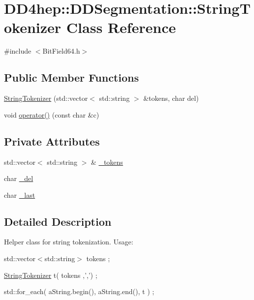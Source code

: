 \hypertarget{class_d_d4hep_1_1_d_d_segmentation_1_1_string_tokenizer}{
\section{DD4hep::DDSegmentation::StringTokenizer Class Reference}
\label{class_d_d4hep_1_1_d_d_segmentation_1_1_string_tokenizer}
}


{\ttfamily \#include $<$BitField64.h$>$}\subsection*{Public Member Functions}
\begin{DoxyCompactItemize}
\item 
\hyperlink{class_d_d4hep_1_1_d_d_segmentation_1_1_string_tokenizer_aae9366c4f1ddf75a606c77af83970f8c}{StringTokenizer} (std::vector$<$ std::string $>$ \&tokens, char del)
\item 
void \hyperlink{class_d_d4hep_1_1_d_d_segmentation_1_1_string_tokenizer_a9a7f740ffc721446c786bd7aed987a4b}{operator()} (const char \&c)
\end{DoxyCompactItemize}
\subsection*{Private Attributes}
\begin{DoxyCompactItemize}
\item 
std::vector$<$ std::string $>$ \& \hyperlink{class_d_d4hep_1_1_d_d_segmentation_1_1_string_tokenizer_aac884d4330a88a11e4460ea9240cdb85}{\_\-tokens}
\item 
char \hyperlink{class_d_d4hep_1_1_d_d_segmentation_1_1_string_tokenizer_a0d18dc607eefcdae2de3f5b01d8294f5}{\_\-del}
\item 
char \hyperlink{class_d_d4hep_1_1_d_d_segmentation_1_1_string_tokenizer_a3865b5d3ed0d300132963b9f214028e0}{\_\-last}
\end{DoxyCompactItemize}


\subsection{Detailed Description}
Helper class for string tokenization. Usage:\par
 std::vector$<$std::string$>$ tokens ; \par
 \hyperlink{class_d_d4hep_1_1_d_d_segmentation_1_1_string_tokenizer}{StringTokenizer} t( tokens ,',') ; \par
 std::for\_\-each( aString.begin(), aString.end(), t ) ; \par


